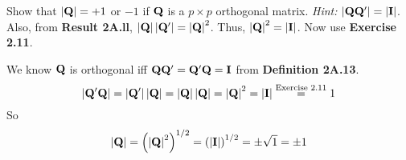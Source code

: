         Show that $\left|\bold{Q}\right| = +1$ or $- 1$ if $\bold{Q}$ is a $p \times p$ orthogonal matrix.
        \newline
        \textit{Hint:} $\left|\bold{Q}\bold{Q}^\prime\right| = \left|\bold{I}\right|$. Also, from \textbf{Result 2A.ll}, $\left|\bold{Q}\right| \left|\bold{Q}^\prime\right| = \left|\bold{Q}\right|^2$. Thus, $\left|\bold{Q}\right|^2 = \left|\bold{I}\right|$. Now use \textbf{Exercise 2.11}.
        \par
        We know $\bold{Q}$ is orthogonal iff $\bold{Q}\bold{Q}^\prime = \bold{Q}^\prime\bold{Q} = \bold{I}$ from \textbf{Definition 2A.13}.
        \[
            \left|\bold{Q}^\prime\bold{Q}\right| 
            =
            \left|\bold{Q}^\prime\right|
            \left|\bold{Q}\right|
            =
            \left|\bold{Q}\right|
            \left|\bold{Q}\right|
            =
            \left|\bold{Q}\right|^2
            =
            \left|\bold{I}\right|
            \overset{\text{Exercise 2.11}}{=}
            1
        \]
        So
        \[
            \left|\bold{Q}\right|
            =
            {\left(\left|\bold{Q}\right|^2\right)}^{1/2}
            =
            {\left(\left|\bold{I}\right|\right)}^{1/2}
            =
            \pm\sqrt{1}
            =
            \pm 1
        \]